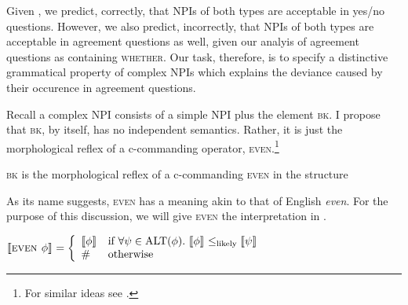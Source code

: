 \documentclass[output=paper,colorlinks,citecolor=brown]{langscibook}
\begin{document}
Given , we predict, correctly, that NPIs of both types are acceptable in yes/no questions. However, we also predict, incorrectly, that NPIs of both types are acceptable in agreement questions as well, given our analyis of agreement questions as containing \textsc{whether}. Our task, therefore, is to specify a distinctive grammatical property of complex NPIs which explains the deviance caused by their occurence in agreement questions. 

Recall a complex NPI consists of a simple NPI plus the element \textsc{bk}. I propose that \textsc{bk}, by itself, has no independent semantics. Rather, it is just the morphological reflex of a c-commanding operator, \textsc{even}.\footnote{For similar ideas see \citet{Heim:1984, Guerzoni:2004, crnic2014against, roelofsenjeong2022focused}.}

\ea \label{complexcond}
\textsc{bk} is the morphological reflex of a c-commanding \textsc{even} in the structure
\z

As its name suggests, \textsc{even} has a meaning akin to that of English \textit{even}. For the purpose of this discussion, we will give \textsc{even} the interpretation in .



\ea
\label{evendef}
$\llbracket \textsc{even $\phi$}\rrbracket^{} =
\left\{\begin{array}{ll}
\llbracket \phi\rrbracket^{} & \mbox{if $\forall \psi \in \text{ALT}(\phi).$ $\llbracket \phi\rrbracket^{} \leq_{\text{likely}} \llbracket \psi\rrbracket^{}$}\\
\#   & \mbox{otherwise}
\end{array}\right.$
\z
\end{document}
